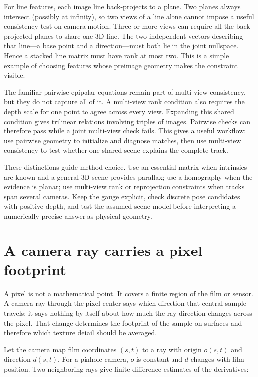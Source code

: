 For line features, each image line back-projects to a plane. Two planes always intersect (possibly at infinity), so two views of a line alone cannot impose a useful consistency test on camera motion. Three or more views can require all the back-projected planes to share one 3D line. The two independent vectors describing that line---a base point and a direction---must both lie in the joint nullspace. Hence a stacked line matrix must have rank at most two. This is a simple example of choosing features whose preimage geometry makes the constraint visible.

The familiar pairwise epipolar equations remain part of multi-view consistency, but they do not capture all of it. A multi-view rank condition also requires the depth scale for one point to agree across every view. Expanding this shared condition gives trilinear relations involving triples of images. Pairwise checks can therefore pass while a joint multi-view check fails. This gives a useful workflow: use pairwise geometry to initialize and diagnose matches, then use multi-view consistency to test whether one shared scene explains the complete track.

These distinctions guide method choice. Use an essential matrix when intrinsics are known and a general 3D scene provides parallax; use a homography when the evidence is planar; use multi-view rank or reprojection constraints when tracks span several cameras. Keep the gauge explicit, check discrete pose candidates with positive depth, and test the assumed scene model before interpreting a numerically precise answer as physical geometry.

\section{A camera ray carries a pixel footprint}\label{02-foundations-ii-ch036-a-camera-ray-carries-a-pixel-footprint}

\hypertarget{02-foundations-ii-ch036-a-camera-ray-carries-a-pixel-footprint}{}

A pixel is not a mathematical point. It covers a finite region of the film or sensor. A camera ray through the pixel center says which direction that central sample travels; it says nothing by itself about how much the ray direction changes across the pixel. That change determines the footprint of the sample on surfaces and therefore which texture detail should be averaged.

Let the camera map film coordinates \((s,t)\) to a ray with origin \(o(s,t)\) and direction \(d(s,t)\). For a pinhole camera, \(o\) is constant and \(d\) changes with film position. Two neighboring rays give finite-difference estimates of the derivatives:

